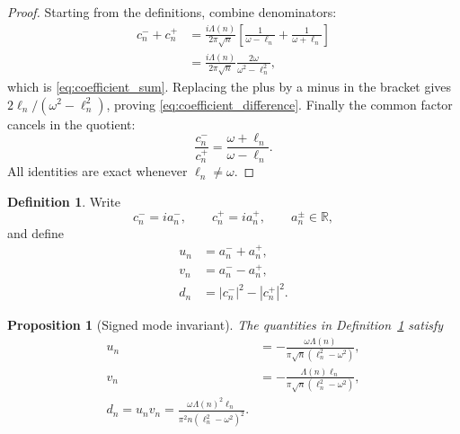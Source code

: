 \documentclass[11pt]{amsart}
\numberwithin{equation}{section}
\theoremstyle{plain}
\newtheorem{proposition}[theorem]{Proposition}
\theoremstyle{definition}
\newtheorem{definition}[theorem]{Definition}
\theoremstyle{remark}
\newcommand{\1}{\mathbf{1}}
\begin{document}
\begin{proof}
Starting from the definitions, combine denominators:
\begin{align}
c_n^-+c_n^+
&=
\frac{i\Lambda(n)}{2\pi\sqrt n}
\left[
\frac1{\omega-\ell_n}+\frac1{\omega+\ell_n}
\right]
\label{eq:coefficient_sum_proof_one}
\\
&=
\frac{i\Lambda(n)}{2\pi\sqrt n}
\frac{2\omega}{\omega^2-\ell_n^2},
\label{eq:coefficient_sum_proof_two}
\end{align}
which is \eqref{eq:coefficient_sum}.  Replacing the plus by a minus in
the bracket gives \(2\ell_n/(\omega^2-\ell_n^2)\), proving
\eqref{eq:coefficient_difference}.  Finally the common factor cancels in
the quotient:
\begin{equation}
\frac{c_n^-}{c_n^+}
=
\frac{\omega+\ell_n}{\omega-\ell_n}.
\label{eq:coefficient_ratio_proof}
\end{equation}
All identities are exact whenever \(\ell_n\neq\omega\).
\end{proof}

\begin{definition}
\label{def:u_v_d}
Write
\begin{equation}
c_n^-=ia_n^-,
\qquad
c_n^+=ia_n^+,
\qquad
a_n^\pm\in\mathbb R,
\label{eq:a_pm_definition}
\end{equation}
and define
\begin{align}
u_n
&=
a_n^-+a_n^+,
\label{eq:un_definition}
\\
v_n
&=
a_n^--a_n^+,
\label{eq:vn_definition}
\\
d_n
&=
|c_n^-|^2-|c_n^+|^2.
\label{eq:dn_definition}
\end{align}
\end{definition}

\begin{proposition}[Signed mode invariant]
\label{prop:signed_mode_invariant}
The quantities in Definition~\ref{def:u_v_d} satisfy
\begin{align}
u_n
&=
-\frac{\omega\Lambda(n)}
{\pi\sqrt n(\ell_n^2-\omega^2)},
\label{eq:un_formula}
\\
v_n
&=
-\frac{\Lambda(n)\ell_n}
{\pi\sqrt n(\ell_n^2-\omega^2)},
\label{eq:vn_formula}
\\
\boxed{
d_n=u_nv_n
=
\frac{\omega\Lambda(n)^2\ell_n}
{\pi^2n(\ell_n^2-\omega^2)^2}.
}
\label{eq:dn_formula}
\end{align}
\end{proposition}
\end{document}
